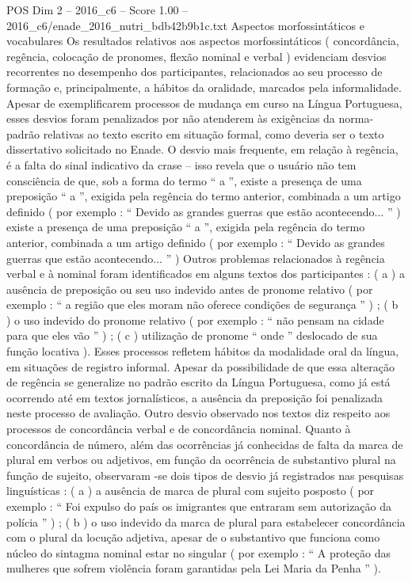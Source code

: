\begin{textsample}{POS Dim 2 – 2016\_c6 – Score 1.00 – 2016\_c6/enade\_2016\_nutri\_bdb42b9b1c.txt}
Aspectos morfossintáticos e vocabulares Os resultados relativos aos aspectos morfossintáticos ( concordância, regência, colocação de pronomes, flexão nominal e verbal ) evidenciam desvios recorrentes no desempenho dos participantes, relacionados ao seu processo de formação e, principalmente, a hábitos da oralidade, marcados pela informalidade.
Apesar de exemplificarem processos de mudança em curso na Língua Portuguesa, esses desvios foram penalizados por não atenderem às exigências da norma-padrão relativas ao texto escrito em situação formal, como deveria ser o texto dissertativo solicitado no Enade.
O desvio mais frequente, em relação à regência, é a falta do sinal indicativo da crase – isso revela que o usuário não tem consciência de que, sob a forma do termo “ a ”, existe a presença de uma preposição “ a ”, exigida pela regência do termo anterior, combinada a um artigo definido ( por exemplo : “ Devido as grandes guerras que estão acontecendo... ” ) existe a presença de uma preposição “ a ”, exigida pela regência do termo anterior, combinada a um artigo definido ( por exemplo : “ Devido as grandes guerras que estão acontecendo... ” ) Outros problemas relacionados à regência verbal e à nominal foram identificados em alguns textos dos participantes : ( a ) a ausência de preposição ou seu uso indevido antes de pronome relativo ( por exemplo : “ a região que eles moram não oferece condições de segurança ” ) ; ( b ) o uso indevido do pronome relativo ( por exemplo : “ não pensam na cidade para que eles vão ” ) ; ( c ) utilização de pronome “ onde ” deslocado de sua função locativa ).
Esses processos refletem hábitos da modalidade oral da língua, em situações de registro informal.
Apesar da possibilidade de que essa alteração de regência se generalize no padrão escrito da Língua Portuguesa, como já está ocorrendo até em textos jornalísticos, a ausência da preposição foi penalizada neste processo de avaliação.
Outro desvio observado nos textos diz respeito aos processos de concordância verbal e de concordância nominal.
Quanto à concordância de número, além das ocorrências já conhecidas de falta da marca de plural em verbos ou adjetivos, em função da ocorrência de substantivo plural na função de sujeito, observaram -se dois tipos de desvio já registrados nas pesquisas linguísticas : ( a ) a ausência de marca de plural com sujeito posposto ( por exemplo : “ Foi expulso do país os imigrantes que entraram sem autorização da polícia ” ) ; ( b ) o uso indevido da marca de plural para estabelecer concordância com o plural da locução adjetiva, apesar de o substantivo que funciona como núcleo do sintagma nominal estar no singular ( por exemplo : “ A proteção das mulheres que sofrem violência foram garantidas pela Lei Maria da Penha ” ).

\end{textsample}
